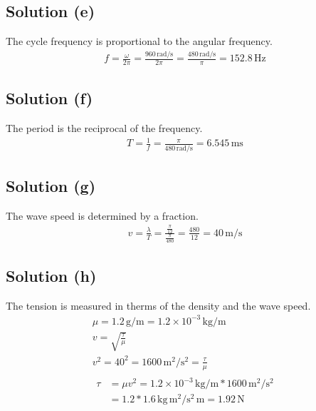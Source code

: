 \documentclass[12pt]{article}
\newcommand{\E}[1]{\times 10^{#1}}
\begin{document}
        \subsection{Solution (e)}
            The cycle frequency is proportional to the angular frequency.
            \begin{gather}
                f   =   \frac{\omega}{2\pi}
                    =   \frac{960\,\unit{\radian/\second}}{2\pi}
                    =   \frac{480\,\unit{\radian/\second}}{\pi}
                    =   \boxed{152.8\,\unit{\hertz}}
            \end{gather}

        \subsection{Solution (f)}
            The period is the reciprocal of the frequency.
            \begin{gather}
                T   =   \frac{1}{f}
                    =   \frac{\pi}{480\,\unit{\radian/\second}}
                    =   \boxed{6.545\,\unit{\milli\second}}
            \end{gather}

        \subsection{Solution (g)}
            The wave speed is determined by a fraction.
            \begin{align}
                v   =   \frac{\lambda}{T}
                    =   \frac{\frac{\pi}{12}}{\frac{\pi}{480}}
                    =   \frac{480}{12}
                    =   \boxed{40\,\unit{\meter/\second}}
            \end{align}

        \subsection{Solution (h)}
            The tension is measured in therms of the density and the wave speed. 
            \begin{gather}
                \mu =   1.2\,\unit{\gram/\meter}
                    =   1.2\E{-3}\,\unit{\kilo\gram/\meter}\\
                v   =   \sqrt{\frac{\tau}{\mu}}\\
                v^2 =   40^2
                    =   1600\,\unit{\meter^2/\second^2}
                    =   \frac{\tau}{\mu}\\
                \begin{align}
                    \tau    &=  \mu v^2
                        =   1.2\E{-3}\,\unit{\kilo\gram/\meter} * 1600\,\unit{\meter^2/\second^2}\\
                        &=  1.2 * 1.6\,\unit{\kilo\gram\,\meter^2/\second^2\,\meter}
                        =   \boxed{1.92\,\unit{\newton}}
                \end{align}
            \end{gather}
\end{document}
